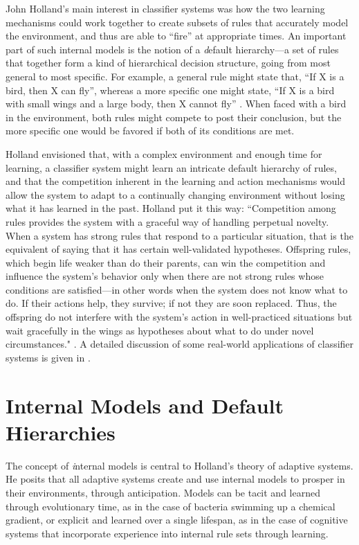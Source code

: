 \documentclass{sig-alternate}
\begin{document}
John Holland's main interest in classifier systems was how the two
learning mechanisms could work together to create subsets of rules
that accurately model the environment, and thus are able to ``fire''
at appropriate times.  An important part of such internal models is
the notion of a {\emph default hierarchy}---a set of rules that
together form a kind of hierarchical decision structure, going from
most general to most specific.  For example, a general rule might
state that, ``If X is a bird, then X can fly'', whereas a more specific
one might state, ``If X is a bird with small wings and a large body,
then X cannot fly'' \cite{Holland1989}.  When faced with a bird in
the environment, both rules might compete to post their conclusion,
but the more specific one would be favored if both of its conditions are met.

Holland envisioned that, with a complex environment and enough time
for learning, a classifier system might learn an intricate default
hierarchy of rules, and that the competition inherent in the learning
and action mechanisms would allow the system to adapt to a continually
changing environment without losing what it has learned in the past.
Holland put it this way: ``Competition among rules provides the system
with a graceful way of handling perpetual novelty.  When a system has
strong rules that respond to a particular situation, that is the
equivalent of saying that it has certain well-validated hypotheses.
Offspring rules, which begin life weaker than do their parents, can
win the competition and influence the system's behavior only when
there are not strong rules whose conditions are satisfied---in other
words when the system does not know what to do.  If their actions
help, they survive; if not they are soon replaced.  Thus, the
offspring do not interfere with the system's action in well-practiced
situations but wait gracefully in the wings as hypotheses about what
to do under novel circumstances." \cite{Holland1992}.  A detailed
discussion of some real-world applications of classifier systems is
given in \cite{Booker1989}.

\section{Internal Models and Default Hierarchies}

The concept of {\emph internal models} is central to Holland's theory
of adaptive systems.  He posits that all adaptive systems create and
use internal models to prosper in their environments, through
anticipation.  Models can be tacit and learned through evolutionary
time, as in the case of bacteria swimming up a chemical gradient, or
explicit and learned over a single lifespan, as in the case of
cognitive systems that incorporate experience into internal rule sets
through learning.  
\end{document}
